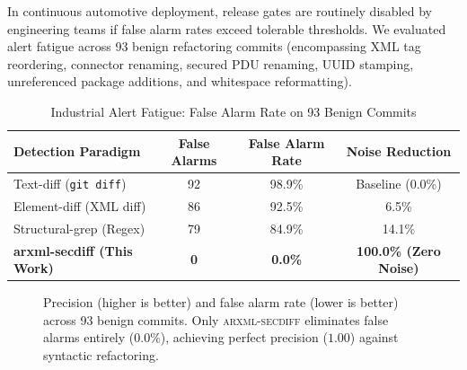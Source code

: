 \documentclass[journal]{IEEEtran}
\begin{document}
In continuous automotive deployment, release gates are routinely disabled by engineering teams if false alarm rates exceed tolerable thresholds. We evaluated alert fatigue across 93 benign refactoring commits (encompassing XML tag reordering, connector renaming, secured PDU renaming, UUID stamping, unreferenced package additions, and whitespace reformatting).

\begin{table}[htbp]
\centering
\caption{Industrial Alert Fatigue: False Alarm Rate on 93 Benign Commits}
\label{tab:noise_reduction}
\renewcommand{\arraystretch}{1.15}
\begin{tabular}{l c c c}
\toprule
\textbf{Detection Paradigm} & \textbf{False Alarms} & \textbf{False Alarm Rate} & \textbf{Noise Reduction} \\
\midrule
Text-diff (\texttt{git diff})   & 92 & 98.9\% & Baseline (0.0\%) \\
Element-diff (XML diff)         & 86 & 92.5\% & 6.5\% \\
Structural-grep (Regex)         & 79 & 84.9\% & 14.1\% \\
\textbf{arxml-secdiff (This Work)} & \textbf{0} & \textbf{0.0\%} & \textbf{100.0\% (Zero Noise)} \\
\bottomrule
\end{tabular}
\end{table}

\begin{figure}[t]
\centering
{}
\caption{Precision (higher is better) and false alarm rate (lower is better) across 93 benign commits. Only \textsc{arxml-secdiff} eliminates false alarms entirely ($0.0\%$), achieving perfect precision ($1.00$) against syntactic refactoring.}
\label{fig:bars}
\end{figure}
\end{document}
